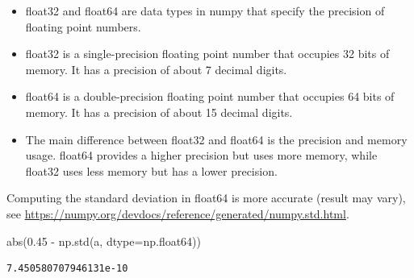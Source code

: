 \documentclass[
  letterpaper,
  DIV=11,
  numbers=noendperiod]{scrreprt}
\newenvironment{Shaded}{\begin{snugshade}}{\end{snugshade}}
\newcommand{\BuiltInTok}[1]{\textcolor[rgb]{0.00,0.23,0.31}{#1}}
\newcommand{\FloatTok}[1]{\textcolor[rgb]{0.68,0.00,0.00}{#1}}
\newcommand{\NormalTok}[1]{\textcolor[rgb]{0.00,0.23,0.31}{#1}}
\newcommand{\OperatorTok}[1]{\textcolor[rgb]{0.37,0.37,0.37}{#1}}
\providecommand{\tightlist}{%
  \setlength{\itemsep}{0pt}\setlength{\parskip}{0pt}}\usepackage{longtable,booktabs,array}
\begin{document}
\begin{tcolorbox}[enhanced jigsaw, opacityback=0, left=2mm, title=\textcolor{quarto-callout-note-color}{\faInfo}\hspace{0.5em}{Float data types}, bottomrule=.15mm, titlerule=0mm, arc=.35mm, leftrule=.75mm, colbacktitle=quarto-callout-note-color!10!white, bottomtitle=1mm, opacitybacktitle=0.6, coltitle=black, colframe=quarto-callout-note-color-frame, toprule=.15mm, breakable, colback=white, toptitle=1mm, rightrule=.15mm]

\begin{itemize}
\tightlist
\item
  float32 and float64 are data types in numpy that specify the precision
  of floating point numbers.
\item
  float32 is a single-precision floating point number that occupies 32
  bits of memory. It has a precision of about 7 decimal digits.
\item
  float64 is a double-precision floating point number that occupies 64
  bits of memory. It has a precision of about 15 decimal digits.
\item
  The main difference between float32 and float64 is the precision and
  memory usage. float64 provides a higher precision but uses more
  memory, while float32 uses less memory but has a lower precision.
\end{itemize}

\end{tcolorbox}

Computing the standard deviation in float64 is more accurate (result may
vary), see
\url{https://numpy.org/devdocs/reference/generated/numpy.std.html}.

\begin{Shaded}
\begin{Highlighting}[]
\BuiltInTok{abs}\NormalTok{(}\FloatTok{0.45} \OperatorTok{{-}}\NormalTok{ np.std(a, dtype}\OperatorTok{=}\NormalTok{np.float64))}
\end{Highlighting}
\end{Shaded}

\begin{verbatim}
7.450580707946131e-10
\end{verbatim}
\end{document}
